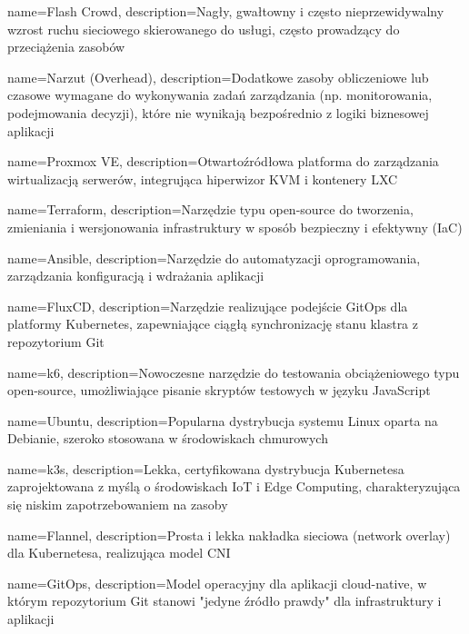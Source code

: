 {
    name=Flash Crowd,
    description={Nagły, gwałtowny i często nieprzewidywalny wzrost ruchu sieciowego skierowanego do usługi, często prowadzący do przeciążenia zasobów}
}

{
    name=Narzut (Overhead),
    description={Dodatkowe zasoby obliczeniowe lub czasowe wymagane do wykonywania zadań zarządzania (np. monitorowania, podejmowania decyzji), które nie wynikają bezpośrednio z logiki biznesowej aplikacji}
}

{
    name=Proxmox VE,
    description={Otwartoźródłowa platforma do zarządzania wirtualizacją serwerów, integrująca hiperwizor KVM i kontenery LXC}
}

{
    name=Terraform,
    description={Narzędzie typu open-source do tworzenia, zmieniania i wersjonowania infrastruktury w sposób bezpieczny i efektywny (IaC)}
}

{
    name=Ansible,
    description={Narzędzie do automatyzacji oprogramowania, zarządzania konfiguracją i wdrażania aplikacji}
}

{
    name=FluxCD,
    description={Narzędzie realizujące podejście GitOps dla platformy Kubernetes, zapewniające ciągłą synchronizację stanu klastra z repozytorium Git}
}

{
    name=k6,
    description={Nowoczesne narzędzie do testowania obciążeniowego typu open-source, umożliwiające pisanie skryptów testowych w języku JavaScript}
}

{
    name=Ubuntu,
    description={Popularna dystrybucja systemu Linux oparta na Debianie, szeroko stosowana w środowiskach chmurowych}
}

{
    name=k3s,
    description={Lekka, certyfikowana dystrybucja Kubernetesa zaprojektowana z myślą o środowiskach IoT i Edge Computing, charakteryzująca się niskim zapotrzebowaniem na zasoby}
}

{
    name=Flannel,
    description={Prosta i lekka nakładka sieciowa (network overlay) dla Kubernetesa, realizująca model CNI}
}

{
    name=GitOps,
    description={Model operacyjny dla aplikacji cloud-native, w którym repozytorium Git stanowi "jedyne źródło prawdy" dla infrastruktury i aplikacji}
}



